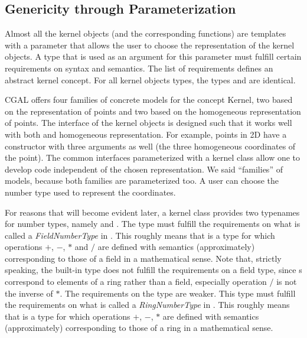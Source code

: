 \subsection{Genericity through Parameterization}

Almost all the kernel objects (and the corresponding functions) are
templates with a parameter that allows the user to choose the
representation of the kernel objects. A type that is used as an
argument for this parameter must fulfill certain requirements on
syntax and semantics. The list of requirements defines an abstract
kernel concept. For all kernel objects types, the types
 and 
 are identical.

CGAL offers four families of concrete models for the concept Kernel,
two based on the  representation of
points and two based on the homogeneous representation of points. The
interface of the kernel objects is designed such that it works well
with both  and homogeneous
representation. For example, points in 2D have a constructor with
three arguments as well (the three homogeneous coordinates of the
point).  The common interfaces parameterized with a kernel class allow
one to develop code independent of the chosen representation.  We said
``families'' of models, because both families are parameterized too.
A user can choose the number type used to represent the coordinates.

For reasons that will become evident later, a kernel class provides
two typenames for number types,
namely  and .%
 The type  must fulfill the
requirements on what is called a {\em FieldNumberType} in \cgal. This
roughly means that  is a type for which operations
$+$, $-$, $*$ and $/$ are defined with semantics (approximately)
corresponding to those of a field in a mathematical sense. Note that,
strictly speaking, the built-in type  does not fulfill the
requirements on a field type, since s correspond to elements
of a ring rather than a field, especially operation $/$ is not the
inverse of $*$.  The requirements on the type  are
weaker.  This type must fulfill the requirements on what is called a
{\em RingNumberType} in \cgal. This roughly means that
 is a type for which operations $+$, $-$, $*$ are
defined with semantics (approximately) corresponding to those of a
ring in a mathematical sense. 

